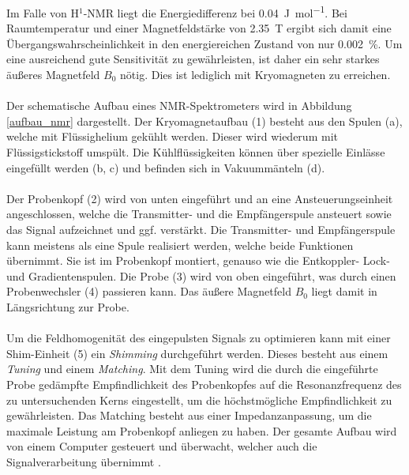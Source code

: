 \documentclass[a4paper, 11pt, headsepline,footsepline,twoside,abstract]{scrbook}
\begin{document}
Im Falle von H$^1$-NMR liegt die Energiedifferenz bei \SI{0.04}{\joule\per\mol}. Bei Raumtemperatur und einer Magnetfeldstärke von \SI{2.35}{\tesla} ergibt sich damit eine Übergangswahrscheinlichkeit in den energiereichen Zustand von nur \SI{0.002}{\percent}. Um eine ausreichend gute Sensitivität zu gewährleisten, ist daher ein sehr starkes äußeres Magnetfeld $B_0$ nötig. Dies ist lediglich mit Kryomagneten zu erreichen.
\\\\
Der schematische Aufbau eines NMR-Spektrometers wird in Abbildung \ref{aufbau_nmr} dargestellt. Der Kryomagnetaufbau (1) besteht aus den Spulen (a), welche mit Flüssighelium gekühlt werden. Dieser wird wiederum mit Flüssigstickstoff umspült. Die Kühlflüssigkeiten können über spezielle Einlässe eingefüllt werden (b, c) und befinden sich in Vakuummänteln (d).
\\\\
 Der Probenkopf (2) wird von unten eingeführt und an eine Ansteuerungseinheit angeschlossen, welche die Transmitter- und die Empfängerspule ansteuert sowie das Signal aufzeichnet und ggf. verstärkt. Die Transmitter- und Empfängerspule kann meistens als eine Spule realisiert werden, welche beide Funktionen übernimmt. Sie ist im Probenkopf montiert, genauso wie die Entkoppler- Lock- und Gradientenspulen. Die Probe (3) wird von oben eingeführt, was durch einen Probenwechsler (4) passieren kann. Das äußere Magnetfeld $B_0$ liegt damit in Längsrichtung zur Probe. 
\\\\
Um die Feldhomogenität des eingepulsten Signals zu optimieren kann mit einer Shim-Einheit (5) ein \textit{Shimming} durchgeführt werden. Dieses besteht aus einem \textit{Tuning} und einem \textit{Matching}. Mit dem Tuning wird die durch die eingeführte Probe gedämpfte Empfindlichkeit des Probenkopfes auf die Resonanzfrequenz des zu untersuchenden Kerns eingestellt, um die höchstmögliche Empfindlichkeit zu gewährleisten. Das Matching besteht aus einer Impedanzanpassung, um die maximale Leistung am Probenkopf anliegen zu haben. Der gesamte Aufbau wird von einem Computer gesteuert und überwacht, welcher auch die Signalverarbeitung übernimmt \cite{Friebolin2011}.
\end{document}

